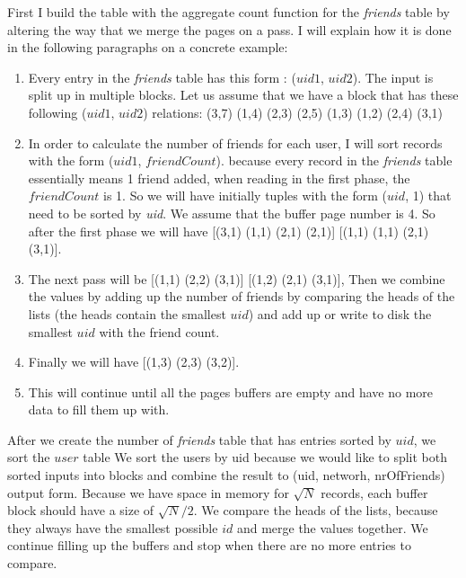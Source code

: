 \documentclass{article}      %
\begin{document}
First I build the table with the aggregate count function for the \emph{friends} table by altering the way that we merge the pages on a pass. I will explain how it is done in the following paragraphs on a concrete example:

\begin{enumerate}
\item 
Every entry in the \emph{friends} table has this form : ($uid1$, $uid2$). The input is split up in multiple blocks. Let us assume that we have a block that has these following ($uid1$, $uid2$) relations:
(3,7) (1,4) (2,3) (2,5) (1,3) (1,2) (2,4) (3,1)
\item
In order to calculate the number of friends for each user, I will sort records with the form ($uid1$, $friendCount$). because every record in the \emph{friends} table essentially means 1 friend added, when reading in the first phase, the $friendCount$ is 1. So we will have initially tuples with the form ($uid$, 1) that need to be sorted by \emph{uid}. We assume that the buffer page number is 4. So after the first phase we will have [(3,1) (1,1) (2,1) (2,1)] [(1,1) (1,1) (2,1) (3,1)]. 
\item
The next pass will be [(1,1) (2,2) (3,1)] [(1,2) (2,1) (3,1)], Then we combine the values by adding up the number of friends by comparing the heads of the lists (the heads contain the smallest $uid$) and add up or write to disk the smallest $uid$ with the friend count.
\item
Finally we will have [(1,3) (2,3) (3,2)].
\item 
This will continue until all the pages buffers are empty and have no more data to fill them up with. 
\end{enumerate}

After we create the number of \emph{friends} table that has entries sorted by $uid$, we sort the $user$ table We sort the users by uid because we would like to split both sorted inputs into blocks and combine the result to (uid, networh, nrOfFriends) output form. Because we have space in memory for \begin{math}\sqrt{N}\end{math} records, each buffer block should have a size of \begin{math}\sqrt{N}/2\end{math}. We compare the heads of the lists, because they always have the smallest possible $id$ and merge the values together. We continue filling up the buffers and stop when there are no more entries to compare.
  
\end{document}
